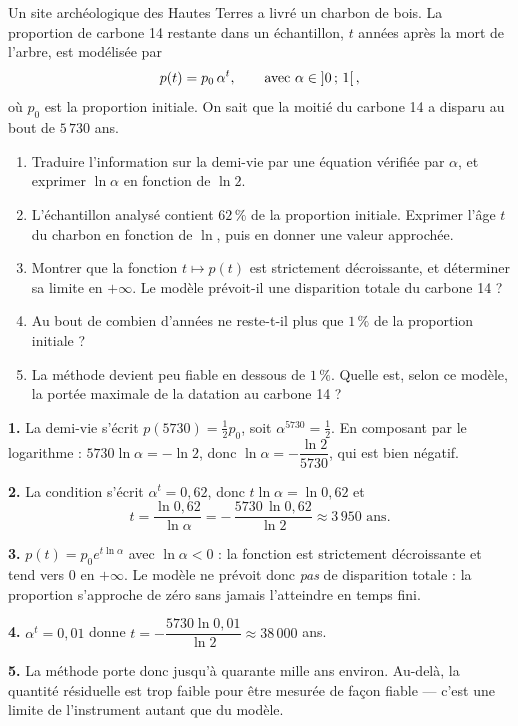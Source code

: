 \begin{jecherche}
Un site archéologique des Hautes Terres a livré un charbon de bois. La
proportion de carbone 14 restante dans un échantillon, $t$ années après la
mort de l'arbre, est modélisée par
\[
  p(t) = p_{0}\,\alpha^{t}, \qquad \text{avec } \alpha \in \left]0\,;\,1\right[,
\]
où $p_{0}$ est la proportion initiale. On sait que la moitié du carbone 14 a
disparu au bout de $5\,730$ ans.

\begin{enumerate}[label=\textbf{\arabic*.}, leftmargin=*, itemsep=0.3em]
  \item Traduire l'information sur la demi-vie par une équation vérifiée
        par $\alpha$, et exprimer $\ln \alpha$ en fonction de $\ln 2$.
  \item L'échantillon analysé contient $62\,\%$ de la proportion initiale.
        Exprimer l'âge $t$ du charbon en fonction de $\ln$, puis en donner une
        valeur approchée.
  \item Montrer que la fonction $t \mapsto p(t)$ est strictement décroissante,
        et déterminer sa limite en $+\infty$. Le modèle prévoit-il une
        disparition totale du carbone 14 ?
  \item Au bout de combien d'années ne reste-t-il plus que $1\,\%$ de la
        proportion initiale ?
  \item La méthode devient peu fiable en dessous de $1\,\%$. Quelle est, selon
        ce modèle, la portée maximale de la datation au carbone 14 ?
\end{enumerate}
\end{jecherche}

\begin{corrige}
\textbf{1.} La demi-vie s'écrit $p(5730) = \tfrac12 p_{0}$, soit
$\alpha^{5730} = \tfrac12$. En composant par le logarithme :
$5730\ln\alpha = -\ln 2$, donc
$\ln\alpha = -\dfrac{\ln 2}{5730}$, qui est bien négatif.

\textbf{2.} La condition s'écrit $\alpha^{t} = 0{,}62$, donc
$t\ln\alpha = \ln 0{,}62$ et
\[
  t = \frac{\ln 0{,}62}{\ln\alpha} = -\,\frac{5730\,\ln 0{,}62}{\ln 2}
  \approx 3\,950 \text{ ans}.
\]

\textbf{3.} $p(t) = p_{0}e^{t\ln\alpha}$ avec $\ln\alpha < 0$ : la fonction est
strictement décroissante et tend vers $0$ en $+\infty$. Le modèle ne prévoit
donc \emph{pas} de disparition totale : la proportion s'approche de zéro sans
jamais l'atteindre en temps fini.

\textbf{4.} $\alpha^{t} = 0{,}01$ donne
$t = -\dfrac{5730\ln 0{,}01}{\ln 2} \approx 38\,000$ ans.

\textbf{5.} La méthode porte donc jusqu'à quarante mille ans environ. Au-delà,
la quantité résiduelle est trop faible pour être mesurée de façon fiable —
c'est une limite de l'instrument autant que du modèle.
\end{corrige}


